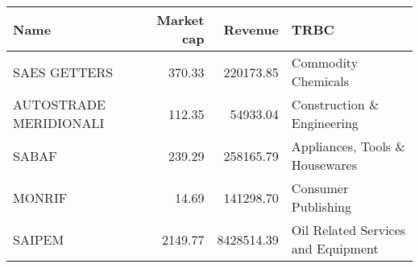 \begin{tabular}{lrrl}
\toprule
                  Name &  Market cap &    Revenue &                               TRBC \\
\midrule
          SAES GETTERS &      370.33 &  220173.85 &                Commodity Chemicals \\
AUTOSTRADE MERIDIONALI &      112.35 &   54933.04 &         Construction \& Engineering \\
                 SABAF &      239.29 &  258165.79 &     Appliances, Tools \& Housewares \\
                MONRIF &       14.69 &  141298.70 &                Consumer Publishing \\
                SAIPEM &     2149.77 & 8428514.39 & Oil Related Services and Equipment \\
\bottomrule
\end{tabular}
